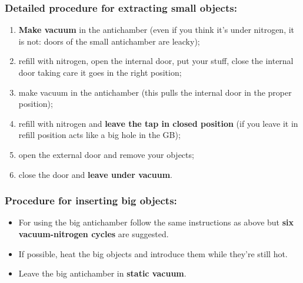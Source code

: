 \documentclass[a4paper,15pt]{scrartcl}
\begin{document}
\subsubsection*{Detailed procedure for extracting small objects:}
\begin{enumerate}
	\item     \textbf{Make vacuum} in the antichamber (even if you think it's under nitrogen, it is not: doors of the small antichamber are leacky);
	\item     refill with nitrogen, open the internal door, put your stuff, close the internal door taking care it goes in the right position;
	\item     make vacuum in the antichamber (this pulls the internal door in the proper position);
	\item     refill with nitrogen and \textbf{leave the tap in closed position} (if you leave it in refill position acts like a big hole in the GB);
	\item     open the external door and remove your objects;
	\item     close the door and \textbf{leave under vacuum}.
\end{enumerate}

\subsubsection*{Procedure for inserting big objects:}
\begin{itemize}
	\item     For using the big antichamber follow the same instructions as above but \textbf{six vacuum-nitrogen cycles} are suggested.
	\item     If possible, heat the big objects and introduce them while they're still hot.
	\item     Leave the big antichamber in \textbf{static vacuum}.
\end{itemize}
\end{document}
